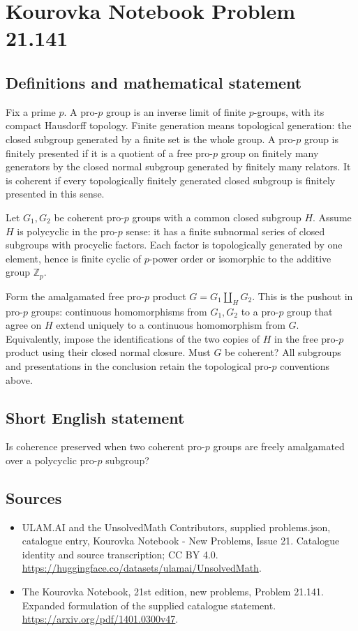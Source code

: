 \documentclass[11pt,a4paper]{article}
\begin{document}
\section*{Kourovka Notebook Problem 21.141}\label{statement}

\subsection{Definitions and mathematical statement}
Fix a prime $p$. A pro-$p$ group is an inverse limit of finite $p$-groups,
with its compact Hausdorff topology. Finite generation means topological
generation: the closed subgroup generated by a finite set is the whole group.
A pro-$p$ group is finitely presented if it is a quotient of a free pro-$p$
group on finitely many generators by the closed normal subgroup generated by
finitely many relators. It is coherent if every topologically finitely generated
closed subgroup is finitely presented in this sense.

Let $G_1,G_2$ be coherent pro-$p$ groups with a common closed subgroup $H$.
Assume $H$ is polycyclic in the pro-$p$ sense: it has a finite subnormal series
of closed subgroups with procyclic factors. Each factor is topologically
generated by one element, hence is finite cyclic of $p$-power order or
isomorphic to the additive group $\mathbb Z_p$.

Form the amalgamated free pro-$p$ product $G=G_1\amalg_H G_2$. This is the
pushout in pro-$p$ groups: continuous homomorphisms from $G_1,G_2$ to a
pro-$p$ group that agree on $H$ extend uniquely to a continuous homomorphism
from $G$. Equivalently, impose the identifications of the two copies of $H$
in the free pro-$p$ product using their closed normal closure.
Must $G$ be coherent? All subgroups and presentations in the conclusion
retain the topological pro-$p$ conventions above.
\subsection{Short English statement}
Is coherence preserved when two coherent pro-$p$ groups are freely amalgamated over a polycyclic pro-$p$ subgroup?
\subsection{Sources}
\begin{itemize}
\item[S1] ULAM.AI and the UnsolvedMath Contributors, supplied problems.json, catalogue entry, Kourovka Notebook - New Problems, Issue 21. Catalogue identity and source transcription; CC BY 4.0.
\url{https://huggingface.co/datasets/ulamai/UnsolvedMath}.
\item[S2] The Kourovka Notebook, 21st edition, new problems, Problem 21.141. Expanded formulation of the supplied catalogue statement.
\url{https://arxiv.org/pdf/1401.0300v47}.
\end{itemize}
\end{document}
